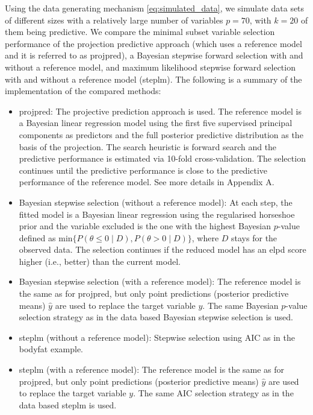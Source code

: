 \documentclass[a4]{article}
\theoremstyle{definition}
\begin{document}
Using the data generating mechanism \eqref{eq:simulated_data}, we
simulate data sets of different sizes with a relatively large number
of variables $p=70$, with $k=20$ of them being predictive.  We compare
the minimal subset variable selection performance of the projection
predictive approach (which uses a reference model and it is referred to as projpred), 
a Bayesian stepwise
forward selection with and without a reference model, and maximum
likelihood stepwise forward selection with and without a reference
model (steplm). The following is a summary of the implementation of the compared methods:
\begin{itemize}
\item projpred: The projective prediction approach is used. 
  The reference model is a Bayesian linear regression
  model using the first five supervised principal components \citep{piironen2018} as predictors
  and the full posterior predictive distribution as the basis of the projection.   
  The search heuristic  is forward search and the predictive performance 
  is estimated via 10-fold cross-validation. The selection continues
  until the predictive performance is close to the predictive
  performance of the reference model. See more details in Appendix A.
  
\item Bayesian stepwise selection (without a reference model): At each step, the fitted model
 is a Bayesian linear regression using the regularised horseshoe
  prior and the variable excluded is the one with the highest Bayesian
  $p$-value defined as $\text{min}\{P(\theta\leq0 \; | \; D),P(\theta>0 \; | \; D)\}$,
  where $D$ stays for the observed data.
The selection continues if the reduced model has an elpd score higher 
(i.e., better) than the current model.

\item Bayesian stepwise selection (with a reference model): The reference model is the same as for projpred, but only point predictions (posterior predictive means) $\hat{y}$ are used to replace the target variable $y$. The same Bayesian
  $p$-value selection strategy as in the data based Bayesian stepwise selection is used.

\item steplm (without a reference model): Stepwise selection using AIC as in the bodyfat example.

\item steplm (with a reference model): The reference model is the same as for
 projpred, but only point predictions (posterior predictive means) $\hat{y}$ 
 are used to replace the target variable $y$. The same AIC selection strategy 
 as in the data based steplm is used.

\end{itemize}
\end{document}
